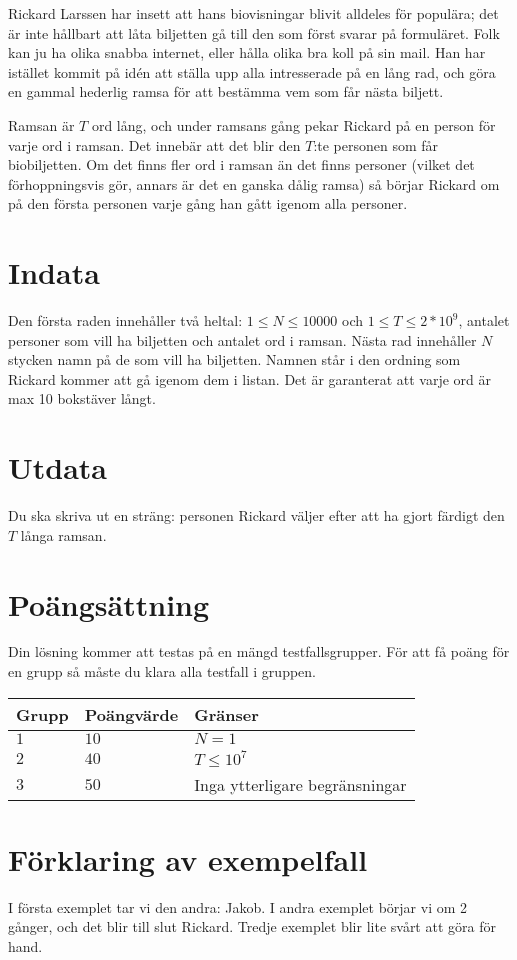 Rickard Larssen har insett att hans biovisningar blivit alldeles för populära; det är inte hållbart att låta biljetten gå till den som först svarar på formuläret.
Folk kan ju ha olika snabba internet, eller hålla olika bra koll på sin mail. 
Han har istället kommit på idén att ställa upp alla intresserade på en lång rad, och göra en gammal hederlig ramsa för att bestämma vem som får nästa biljett. 

Ramsan är $T$ ord lång, och under ramsans gång pekar Rickard på en person för varje ord i ramsan. Det innebär att det blir den $T$:te personen som får biobiljetten. Om det finns fler ord i ramsan än det finns personer (vilket det förhoppningsvis gör, annars är det en ganska dålig ramsa) så börjar Rickard om på den första personen varje gång han gått igenom alla personer.

\section*{Indata}
Den första raden innehåller två heltal: $1 \leq N \leq 10000$ och $1\leq T \leq 2*10^9$, antalet personer som vill ha biljetten och antalet ord i ramsan.
Nästa rad innehåller $N$ stycken namn på de som vill ha biljetten. Namnen står i den ordning som Rickard kommer att gå igenom dem i listan.
Det är garanterat att varje ord är max 10 bokstäver långt.

\section*{Utdata}
Du ska skriva ut en sträng: personen Rickard väljer efter att ha gjort färdigt den $T$ långa ramsan.

\section*{Poängsättning}
Din lösning kommer att testas på en mängd testfallsgrupper.
För att få poäng för en grupp så måste du klara alla testfall i gruppen.

\noindent
\begin{tabular}{| l | l | p{12cm} |}
  \hline
  Grupp & Poängvärde & Gränser \\ \hline
  $1$   & $10$       & $N=1$ \\ \hline
  $2$   & $40$       & $T \leq 10^7$ \\ \hline
  $3$   & $50$       & Inga ytterligare begränsningar \\ \hline
\end{tabular}

\section*{Förklaring av exempelfall}
I första exemplet tar vi den andra: Jakob.
I andra exemplet börjar vi om 2 gånger, och det blir till slut Rickard.
Tredje exemplet blir lite svårt att göra för hand.